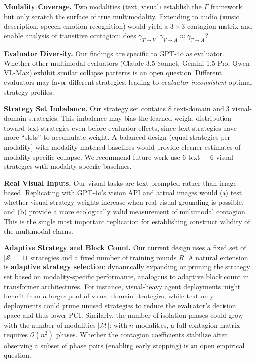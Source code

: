 \documentclass[11pt,a4paper]{article}
\begin{document}
\textbf{Modality Coverage.} Two modalities (text, visual) establish the $\Gamma$ framework but only scratch the surface of true multimodality. Extending to audio (music description, speech emotion recognition) would yield a $3\times 3$ contagion matrix and enable analysis of transitive contagion: does $\gamma_{T\to V} \cdot \gamma_{V\to A} \approx \gamma_{T\to A}$?

\textbf{Evaluator Diversity.} Our findings are specific to GPT-4o as evaluator. Whether other multimodal evaluators (Claude 3.5 Sonnet, Gemini 1.5 Pro, Qwen-VL-Max) exhibit similar collapse patterns is an open question. Different evaluators may favor different strategies, leading to \textit{evaluator-inconsistent} optimal strategy profiles.

\textbf{Strategy Set Imbalance.} Our strategy set contains 8 text-domain and 3 visual-domain strategies. This imbalance may bias the learned weight distribution toward text strategies even before evaluator effects, since text strategies have more ``slots'' to accumulate weight. A balanced design (equal strategies per modality) with modality-matched baselines would provide cleaner estimates of modality-specific collapse. We recommend future work use 6 text + 6 visual strategies with modality-specific baselines.

\textbf{Real Visual Inputs.} Our visual tasks are text-prompted rather than image-based. Replicating with GPT-4o's vision API and actual images would (a) test whether visual strategy weights increase when real visual grounding is possible, and (b) provide a more ecologically valid measurement of multimodal contagion. This is the single most important replication for establishing construct validity of the multimodal claims.

\textbf{Adaptive Strategy and Block Count.} Our current design uses a fixed set of $|\mathcal{S}|=11$ strategies and a fixed number of training rounds $R$. A natural extension is \textbf{adaptive strategy selection}: dynamically expanding or pruning the strategy set based on modality-specific performance, analogous to adaptive block count in transformer architectures. For instance, visual-heavy agent deployments might benefit from a larger pool of visual-domain strategies, while text-only deployments could prune unused strategies to reduce the evaluator's decision space and thus lower PCI. Similarly, the number of isolation phases could grow with the number of modalities $|\mathcal{M}|$: with $n$ modalities, a full contagion matrix requires $\mathcal{O}(n^2)$ phases. Whether the contagion coefficients stabilize after observing a subset of phase pairs (enabling early stopping) is an open empirical question.
\end{document}
